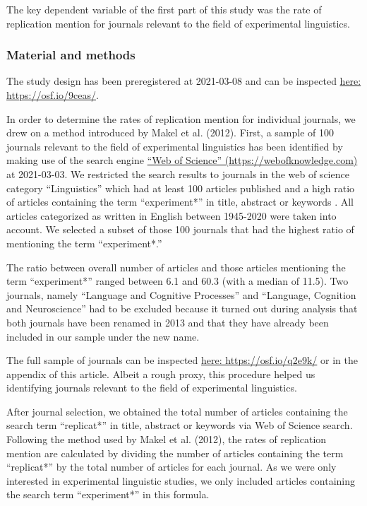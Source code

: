 \documentclass[]{elsarticle} %
\begin{document}
The key dependent variable of the first part of this study was the rate
of replication mention for journals relevant to the field of
experimental linguistics.

\hypertarget{material-and-methods}{%
\subsubsection{Material and methods}\label{material-and-methods}}

The study design has been preregistered at 2021-03-08 and can be
inspected \href{https://osf.io/9ceas/}{here: https://osf.io/9ceas/}.

In order to determine the rates of replication mention for individual
journals, we drew on a method introduced by Makel et al. (2012). First,
a sample of 100 journals relevant to the field of experimental
linguistics has been identified by making use of the search engine
\href{https://webofknowledge.com}{``Web of Science''
(https://webofknowledge.com)} at 2021-03-03. We restricted the search
results to journals in the web of science category ``Linguistics'' which
had at least 100 articles published and a high ratio of articles
containing the term ``experiment*'' in title, abstract or keywords . All
articles categorized as written in English between 1945-2020 were taken
into account. We selected a subset of those 100 journals that had the
highest ratio of mentioning the term ``experiment*.''

The ratio between overall number of articles and those articles
mentioning the term ``experiment*'' ranged between 6.1 and 60.3 (with a
median of 11.5). Two journals, namely ``Language and Cognitive
Processes'' and ``Language, Cognition and Neuroscience'' had to be
excluded because it turned out during analysis that both journals have
been renamed in 2013 and that they have already been included in our
sample under the new name.

The full sample of journals can be inspected
\href{https://osf.io/q2e9k/}{here: https://osf.io/q2e9k/} or in the
appendix of this article. Albeit a rough proxy, this procedure helped us
identifying journals relevant to the field of experimental linguistics.

After journal selection, we obtained the total number of articles
containing the search term ``replicat*'' in title, abstract or keywords
via Web of Science search. Following the method used by Makel et al.
(2012), the rates of replication mention are calculated by dividing the
number of articles containing the term ``replicat*'' by the total number
of articles for each journal. As we were only interested in experimental
linguistic studies, we only included articles containing the search term
``experiment*'' in this formula.
\end{document}
